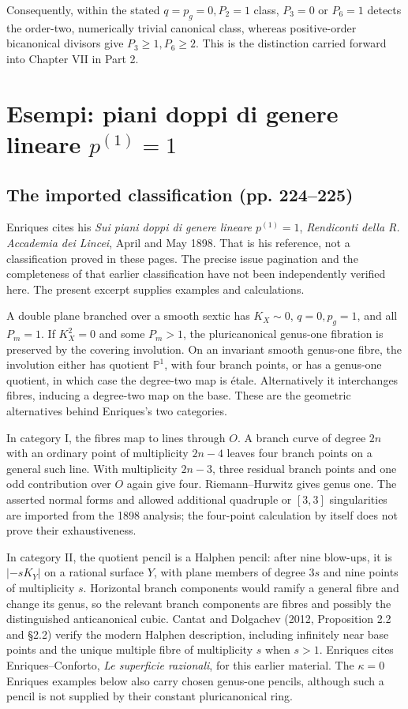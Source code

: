 Consequently, within the stated \(q=p_g=0,P_2=1\) class, \(P_3=0\) or \(P_6=1\) detects the order-two, numerically trivial canonical class, whereas positive-order bicanonical divisors give \(P_3\geq1,P_6\geq2\). This is the distinction carried forward into Chapter VII in Part 2.

\section[Esempi di piani doppi]{Esempi: piani doppi di genere lineare \texorpdfstring{$p^{(1)}=1$}{p(1) = 1}}
\label{cp1-vi-3}

\subsection{The imported classification (pp. 224--225)}

Enriques cites his \emph{Sui piani doppi di genere lineare \(p^{(1)}=1\)}, \emph{Rendiconti della R. Accademia dei Lincei}, April and May 1898. That is his reference, not a classification proved in these pages. The precise issue pagination and the completeness of that earlier classification have not been independently verified here. The present excerpt supplies examples and calculations.

A double plane branched over a smooth sextic has \(K_X\sim0\), \(q=0,p_g=1\), and all \(P_m=1\). If \(K_X^2=0\) and some \(P_m>1\), the pluricanonical genus-one fibration is preserved by the covering involution. On an invariant smooth genus-one fibre, the involution either has quotient \(\mathbb P^1\), with four branch points, or has a genus-one quotient, in which case the degree-two map is étale. Alternatively it interchanges fibres, inducing a degree-two map on the base. These are the geometric alternatives behind Enriques's two categories.

In category I, the fibres map to lines through \(O\). A branch curve of degree \(2n\) with an ordinary point of multiplicity \(2n-4\) leaves four branch points on a general such line. With multiplicity \(2n-3\), three residual branch points and one odd contribution over \(O\) again give four. Riemann--Hurwitz gives genus one. The asserted normal forms and allowed additional quadruple or \([3,3]\) singularities are imported from the 1898 analysis; the four-point calculation by itself does not prove their exhaustiveness.

In category II, the quotient pencil is a Halphen pencil: after nine blow-ups, it is \(|-sK_Y|\) on a rational surface \(Y\), with plane members of degree \(3s\) and nine points of multiplicity \(s\). Horizontal branch components would ramify a general fibre and change its genus, so the relevant branch components are fibres and possibly the distinguished anticanonical cubic. Cantat and Dolgachev (2012, Proposition 2.2 and §2.2) verify the modern Halphen description, including infinitely near base points and the unique multiple fibre of multiplicity \(s\) when \(s>1\). Enriques cites Enriques--Conforto, \emph{Le superficie razionali}, for this earlier material. The \(\kappa=0\) Enriques examples below also carry chosen genus-one pencils, although such a pencil is not supplied by their constant pluricanonical ring.

